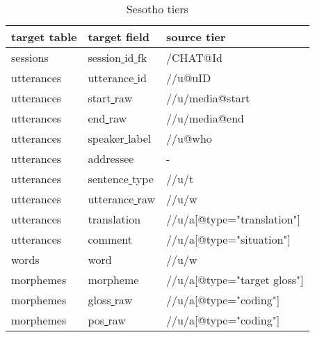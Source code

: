 \documentclass[a4paper, 11pt]{book}
\newcommand{\und}{\underline{{ }}\hspace{0.2mm}}	%
\begin{document}
\begin{table}[ht!]
	\centering
	\begin{tabular}{lll}
		\toprule
			\textbf{target table} & \textbf{target field} & \textbf{source tier} \\
		\midrule
			sessions 	& session\und id\und fk 	& /CHAT@Id \\
			utterances 	& utterance\und id	& //u@uID \\
			utterances 	& start\und raw		& //u/media@start \\
			utterances 	& end\und raw		& //u/media@end \\
			utterances 	& speaker\und label	& //u@who \\
			utterances 	& addressee			& - \\
			utterances 	& sentence\und type	& //u/t \\
			utterances 	& utterance\und raw	& //u/w \\
			utterances 	& translation		& //u/a[@type="translation"] \\
			utterances 	& comment			& //u/a[@type="situation"] \\

			words	 	& word		& //u/w \\
			morphemes	& morpheme			& //u/a[@type="target gloss"] \\
			morphemes	& gloss\und raw		& //u/a[@type="coding"] \\
			morphemes	& pos\und raw		& //u/a[@type="coding"] \\

		\bottomrule
	\end{tabular}
	\caption{Sesotho tiers}
	\label{tab:Sesotho tiers}
\end{table}
\end{document}
